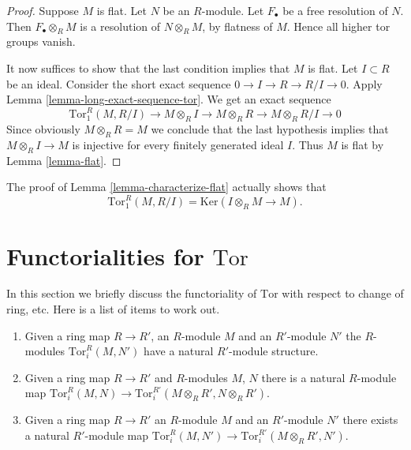 \begin{proof}
Suppose $M$ is flat. Let $N$ be an $R$-module.
Let $F_\bullet$ be a free resolution of $N$.
Then $F_\bullet \otimes_R M$ is a resolution of $N\otimes_R M$,
by flatness of $M$. Hence all higher tor groups vanish.

\medskip\noindent
It now suffices to show that the last condition implies that
$M$ is flat. Let $I \subset R$ be an ideal.
Consider the short exact sequence
$0 \to I \to R \to R/I \to 0$. Apply
Lemma \ref{lemma-long-exact-sequence-tor}. We get an
exact sequence
$$
\text{Tor}_1^R(M, R/I) \to
M \otimes_R I \to
M \otimes_R R \to
M \otimes_R R/I \to
0
$$
Since obviously $M\otimes_R R = M$ we conclude that the
last hypothesis implies that $M \otimes_R I \to M$ is
injective for every finitely generated ideal $I$. 
Thus $M$ is flat by Lemma \ref{lemma-flat}.
\end{proof}

\begin{remark}
\label{remark-Tor-ring-mod-ideal}
The proof of Lemma \ref{lemma-characterize-flat} actually shows
that
$$
\text{Tor}_1^R(M, R/I)
=
\text{Ker}(I \otimes_R M \to M).
$$
\end{remark}














\section{Functorialities for $\text{Tor}$}
\label{section-functoriality-tor}

\noindent
In this section we briefly discuss the functoriality
of $\text{Tor}$ with respect to change of ring, etc.
Here is a list of items to work out.
\begin{enumerate}
\item Given a ring map $R \to R'$, an $R$-module
$M$ and an $R'$-module $N'$
the $R$-modules $\text{Tor}_i^R(M, N')$ have
a natural $R'$-module structure.
\item Given a ring map $R \to R'$ and $R$-modules
$M$, $N$ there is a natural $R$-module map
$\text{Tor}_i^R(M, N) \to \text{Tor}_i^{R'}(M \otimes_R R', N\otimes_R R')$.
\item Given a ring map $R \to R'$ an $R$-module $M$ and
an $R'$-module $N'$ there exists a natural
$R'$-module map
$\text{Tor}_i^R(M, N') \to \text{Tor}_i^{R'}(M \otimes_R R', N')$.
\end{enumerate}

